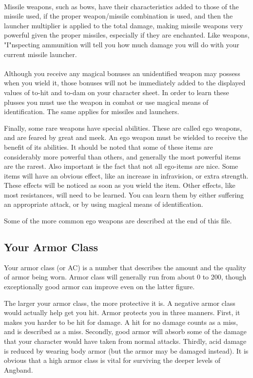 \paragraph{}Missile weapons, such as bows, have their characteristics added to those
of the missile used, if the proper weapon/missile combination is used,
and then the launcher multiplier is applied to the total damage, making
missile weapons very powerful given the proper missiles, especially if
they are enchanted. Like weapons, "I"nspecting ammunition will tell you
how much damage you will do with your current missile launcher.

\paragraph{}Although you receive any magical bonuses an unidentified weapon may possess
when you wield it, those bonuses will not be immediately added to the
displayed values of to-hit and to-dam on your character sheet. In order to
learn these plusses you must use the weapon in combat or use magical means of
identification. The same applies for missiles and launchers.

Finally, some rare weapons have special abilities. These are called ego
weapons, and are feared by great and meek. An ego weapon must be wielded
to receive the benefit of its abilities. It should be noted that some of
these items are considerably more powerful than others, and generally the
most powerful items are the rarest. Also important is the fact that not all
ego-items are nice. Some items will have an obvious effect, like an increase
in infravision, or extra strength. These effects will be noticed as soon as
you wield the item. Other effects, like most resistances, will need to be
learned. You can learn them by either suffering an appropriate attack, or
by using magical means of identification.

Some of the more common ego weapons are described at the end of this file.


\subsection{Your Armor Class}

Your armor class (or AC) is a number that describes the amount and the
quality of armor being worn. Armor class will generally run from about 0 to
200, though exceptionally good armor can improve even on the latter figure.
 
The larger your armor class, the more protective it is. A negative armor
class would actually help get you hit. Armor protects you in three manners.
First, it makes you harder to be hit for damage. A hit for no damage
counts as a miss, and is described as a miss. Secondly, good armor will
absorb some of the damage that your character would have taken from normal
attacks. Thirdly, acid damage is reduced by wearing body armor (but the
armor may be damaged instead). It is obvious that a high armor class is
vital for surviving the deeper levels of Angband.

